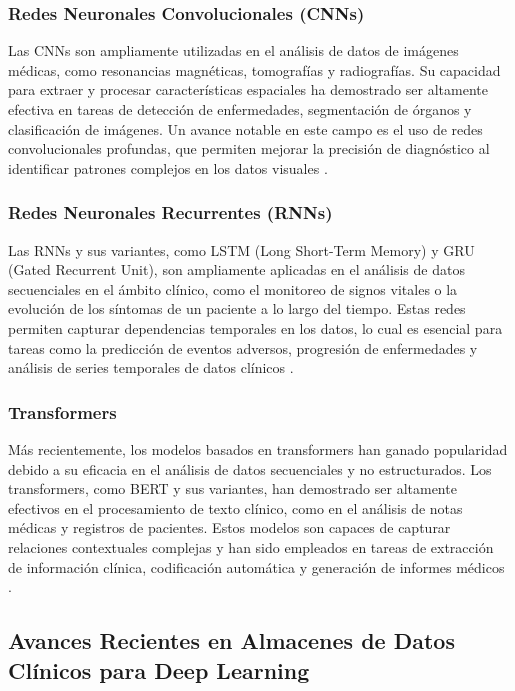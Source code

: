 \documentclass{article}
\begin{document}
\subsubsection{Redes Neuronales Convolucionales (CNNs)}

Las CNNs son ampliamente utilizadas en el análisis de datos de imágenes médicas, como resonancias magnéticas, tomografías y radiografías. Su capacidad para extraer y procesar características espaciales ha demostrado ser altamente efectiva en tareas de detección de enfermedades, segmentación de órganos y clasificación de imágenes. Un avance notable en este campo es el uso de redes convolucionales profundas, que permiten mejorar la precisión de diagnóstico al identificar patrones complejos en los datos visuales \cite{litjens2017survey}.

\subsubsection{Redes Neuronales Recurrentes (RNNs)}

Las RNNs y sus variantes, como LSTM (Long Short-Term Memory) y GRU (Gated Recurrent Unit), son ampliamente aplicadas en el análisis de datos secuenciales en el ámbito clínico, como el monitoreo de signos vitales o la evolución de los síntomas de un paciente a lo largo del tiempo. Estas redes permiten capturar dependencias temporales en los datos, lo cual es esencial para tareas como la predicción de eventos adversos, progresión de enfermedades y análisis de series temporales de datos clínicos \cite{choi2016doctor}.

\subsubsection{Transformers}

Más recientemente, los modelos basados en transformers han ganado popularidad debido a su eficacia en el análisis de datos secuenciales y no estructurados. Los transformers, como BERT y sus variantes, han demostrado ser altamente efectivos en el procesamiento de texto clínico, como en el análisis de notas médicas y registros de pacientes. Estos modelos son capaces de capturar relaciones contextuales complejas y han sido empleados en tareas de extracción de información clínica, codificación automática y generación de informes médicos \cite{devlin2018bert, li2020behrt}.

\subsection{Avances Recientes en Almacenes de Datos Clínicos para Deep Learning}
\end{document}
